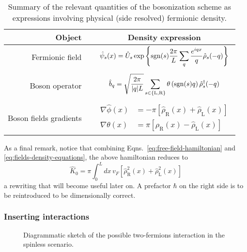 \begin{table}
	\centering
	\begin{tabular}{r c c}
		\toprule
		Object && Density expression\\
		\midrule
		Fermionic field && $\displaystyle \hat \psi_s (x) = \hat U_s \exp\left\{ \mathrm{sgn}(s) \frac{2\pi}{L} \sum_q \frac{e^{iqx}}{q} \hat \rho_s (-q) \right\}$ \\
		&&\\
		Boson operator && $\displaystyle \hat b_q = \sqrt{\frac{2\pi}{\abs{q}L}} \sum_{s \in \left\{\mathrm L, \mathrm R\right\}} \theta \left(\mathrm{sgn}(s) q\right) \hat \rho_s^\dagger (-q)$ \\
		&&\\ 
		Boson fields gradients && $\displaystyle \begin{aligned}
			\nabla \hat \phi(x) &= - \pi \left[ \hat \rho_\mathrm{R}(x) + \hat \rho_\mathrm{L}(x) \right] \\ 
			\nabla \hat \theta(x) &= \pi \left[ \hat \rho_\mathrm{R}(x) - \hat \rho_\mathrm{L}(x) \right]
		\end{aligned}$ \\
		\bottomrule
	\end{tabular}
	\caption{Summary of the relevant quantities of the bosonization scheme as expressions involving physical (side resolved) fermionic density.}
	\label{tab:bosonization-formulas}
\end{table}

As a final remark, notice that combining Eqns.~\eqref{eq:free-field-hamiltonian} and \eqref{eq:fields-density-equations}, the above hamiltonian reduces to
\begin{equation}\label{eq:free-field-hamiltonian-density-integral}
	\hat K_0 = \pi \int_0^L dx \, v_F \left[  
		\hat \rho_\mathrm{R}^2 (x) + \hat \rho_\mathrm{L}^2 (x)
	\right]
\end{equation}
a rewriting that will become useful later on. A prefactor $\hbar$ on the right side is to be reintroduced to be dimensionally correct.

\subsubsection{Inserting interactions}

\begin{figure}
	\centering
	\subfloat[][$g_1 = V(q \approx \pm 2k_F)$ process.]{
		
		\label{fig:g1-process}
	}
	\subfloat[][$g_2 = V(q \approx 0)$ process.]{
		
		\label{fig:g2-process}
	}
	\subfloat[][$g_4 = V(q \approx 0)$ process.]{
		
		\label{fig:g4-process}
	}
	\caption{Diagrammatic sketch of the possible two-fermions interaction in the spinless scenario.}
	\label{fig:g-processes}
\end{figure}

